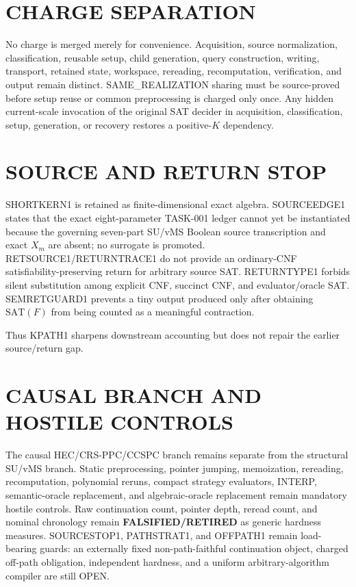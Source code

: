 \documentclass[11pt]{article}
\begin{document}
\section*{CHARGE SEPARATION}
No charge is merged merely for convenience. Acquisition, source normalization, classification, reusable setup, child generation, query construction, writing, transport, retained state, workspace, rereading, recomputation, verification, and output remain distinct. SAME\_REALIZATION sharing must be source-proved before setup reuse or common preprocessing is charged only once. Any hidden current-scale invocation of the original SAT decider in acquisition, classification, setup, generation, or recovery restores a positive-\(K\) dependency.

\section*{SOURCE AND RETURN STOP}
SHORTKERN1 is retained as finite-dimensional exact algebra. SOURCEEDGE1 states that the exact eight-parameter TASK-001 ledger cannot yet be instantiated because the governing seven-part SU/vMS Boolean source transcription and exact \(X_m\) are absent; no surrogate is promoted. RETSOURCE1/RETURNTRACE1 do not provide an ordinary-CNF satisfiability-preserving return for arbitrary source SAT. RETURNTYPE1 forbids silent substitution among explicit CNF, succinct CNF, and evaluator/oracle SAT. SEMRETGUARD1 prevents a tiny output produced only after obtaining \(\mathrm{SAT}(F)\) from being counted as a meaningful contraction.

Thus KPATH1 sharpens downstream accounting but does not repair the earlier source/return gap.

\section*{CAUSAL BRANCH AND HOSTILE CONTROLS}
The causal HEC/CRS-PPC/CCSPC branch remains separate from the structural SU/vMS branch. Static preprocessing, pointer jumping, memoization, rereading, recomputation, polynomial reruns, compact strategy evaluators, INTERP, semantic-oracle replacement, and algebraic-oracle replacement remain mandatory hostile controls. Raw continuation count, pointer depth, reread count, and nominal chronology remain \textbf{FALSIFIED/RETIRED} as generic hardness measures. SOURCESTOP1, PATHSTRAT1, and OFFPATH1 remain load-bearing guards: an externally fixed non-path-faithful continuation object, charged off-path obligation, independent hardness, and a uniform arbitrary-algorithm compiler are still OPEN.
\end{document}

